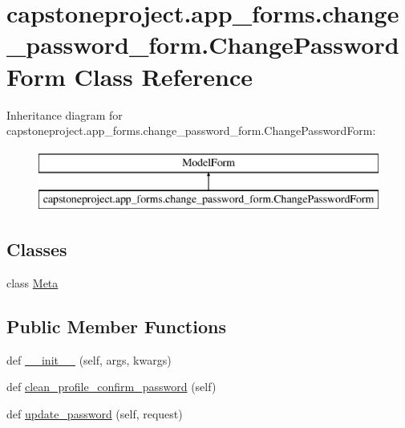 \hypertarget{classcapstoneproject_1_1app__forms_1_1change__password__form_1_1_change_password_form}{}\section{capstoneproject.\+app\+\_\+forms.\+change\+\_\+password\+\_\+form.\+Change\+Password\+Form Class Reference}
\label{classcapstoneproject_1_1app__forms_1_1change__password__form_1_1_change_password_form}
Inheritance diagram for capstoneproject.\+app\+\_\+forms.\+change\+\_\+password\+\_\+form.\+Change\+Password\+Form\+:\begin{figure}[H]
\begin{center}
\leavevmode
\includegraphics[height=2.000000cm]{classcapstoneproject_1_1app__forms_1_1change__password__form_1_1_change_password_form}
\end{center}
\end{figure}
\subsection*{Classes}
\begin{DoxyCompactItemize}
\item 
class \mbox{\hyperlink{classcapstoneproject_1_1app__forms_1_1change__password__form_1_1_change_password_form_1_1_meta}{Meta}}
\end{DoxyCompactItemize}
\subsection*{Public Member Functions}
\begin{DoxyCompactItemize}
\item 
def \mbox{\hyperlink{classcapstoneproject_1_1app__forms_1_1change__password__form_1_1_change_password_form_aae4a65820ed8ec25d2b1b2b91a6cee09}{\+\_\+\+\_\+init\+\_\+\+\_\+}} (self, args, kwargs)
\item 
def \mbox{\hyperlink{classcapstoneproject_1_1app__forms_1_1change__password__form_1_1_change_password_form_ade7b5d4ded8d094aa2086b6d73bb0f0a}{clean\+\_\+profile\+\_\+confirm\+\_\+password}} (self)
\item 
def \mbox{\hyperlink{classcapstoneproject_1_1app__forms_1_1change__password__form_1_1_change_password_form_a133ab5a9b98f818ba6fdd978c4a7624a}{update\+\_\+password}} (self, request)
\end{DoxyCompactItemize}
